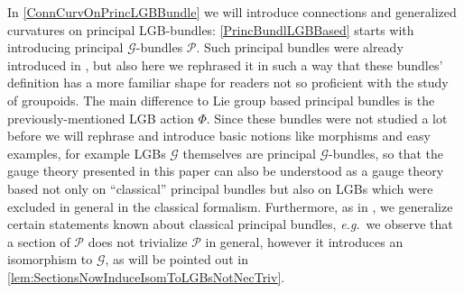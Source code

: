 \documentclass[reqno,a4paper,oneside]{amsart}
\theoremstyle{plain}
\theoremstyle{remark}
\theoremstyle{definition}
\def\bas#1\eas{\begin{align*}#1\end{align*}}
\begin{document}
In \ref{ConnCurvOnPrincLGBBundle} we will introduce connections and generalized curvatures on principal LGB-bundles: \ref{PrincBundlLGBBased} starts with introducing principal $\mathcal{G}$-bundles $\mathcal{P}$. Such principal bundles were already introduced in \cite[\S 5.7, page 144f.]{GroupoidBasedPrincipalBundles}, but also here we rephrased it in such a way that these bundles' definition has a more familiar shape for readers not so proficient with the study of groupoids. The main difference to Lie group based principal bundles is the previously-mentioned LGB action $\Phi$. Since these bundles were not studied a lot before we will rephrase \cite{GroupoidBasedPrincipalBundles} and introduce basic notions like morphisms and easy examples, for example LGBs $\mathcal{G}$ themselves are principal $\mathcal{G}$-bundles, so that the gauge theory presented in this paper can also be understood as a gauge theory based not only on ``classical'' principal bundles but also on LGBs which were excluded in general in the classical formalism. Furthermore, as in \cite{GroupoidBasedPrincipalBundles}, we generalize certain statements known about classical principal bundles, \textit{e.g.}\ we observe that a section of $\mathcal{P}$ does not trivialize $\mathcal{P}$ in general, however it introduces an isomorphism to $\mathcal{G}$, as will be pointed out in \ref{lem:SectionsNowInduceIsomToLGBsNotNecTriv}.
\end{document}
